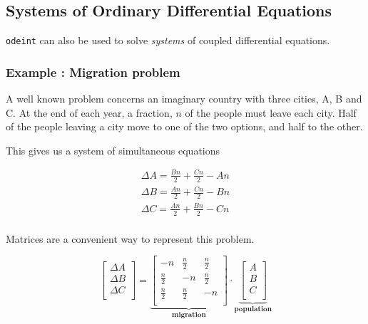 \documentclass[11pt]{article}
\begin{document}
    \subsection{Systems of Ordinary Differential
Equations}\label{systems-of-ordinary-differential-equations}

 \texttt{odeint} can also be used to solve \emph{systems} of coupled
differential equations.

    \subsubsection{Example : Migration
problem}\label{example-migration-problem}

A well known problem concerns an imaginary country with three cities, A,
B and C. At the end of each year, a fraction, \(n\) of the people must
leave each city. Half of the people leaving a city move to one of the
two options, and half to the other.

    This gives us a system of simultaneous equations

\begin{align*}
\Delta A = \frac{Bn}{2} + \frac{Cn}{2} - An \\
\Delta B = \frac{An}{2} + \frac{Cn}{2} - Bn\\
\Delta C = \frac{An}{2} + \frac{Bn}{2} -Cn \\
\end{align*}

    Matrices are a convenient way to represent this problem.

    \begin{equation*}
\begin{bmatrix}
\Delta A \\
\Delta B \\
\Delta C \\
\end{bmatrix}
=
\underbrace{
\begin{bmatrix}
-n & \frac{n}{2} & \frac{n}{2} \\
\frac{n}{2} & -n & \frac{n}{2} \\
\frac{n}{2} & \frac{n}{2} & -n \\
\end{bmatrix}
}_{\mathbf{migration}}
\cdot
\underbrace{
\begin{bmatrix}
A \\
B \\
C \\
\end{bmatrix}
}_{\mathbf{population}}
\end{equation*}
\end{document}
